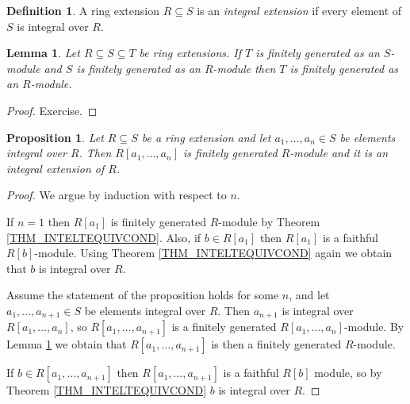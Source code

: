 \documentclass[12pt, letterpaper, oneside]{article}
\theoremstyle{plain}
\newtheorem{lemma}[theorem]{Lemma}
\newtheorem{proposition}[theorem]{Proposition}
\theoremstyle{definition}
\newtheorem{definition}[theorem]{Definition}
\newcommand{\vs}{\vskip 5mm}
\begin{document}
\vs\vs

\begin{definition}
A ring extension $R\subseteq S$ is an \emph{integral extension} if every element of $S$
is integral over $R$. 
\end{definition}

\vs\vs

\begin{lemma}
\label{LEMMA_COMPFINGENMOD}
Let $R\subseteq S \subseteq T$ be ring extensions. If $T$ is finitely generated as an
$S$-module and  $S$ is finitely generated as an $R$-module then $T$ is finitely generated as an 
$R$-module.
\end{lemma}

\vs

\begin{proof}
Exercise. 
\end{proof}

\vs\vs

\begin{proposition}
\label{PROP_INTELTSINTEXT}
Let $R\subseteq S$ be a  ring extension and let $a_{1}, \dots, a_{n}\in S $ be elements 
integral over $R$. Then $R[a_{1}, \dots, a_{n}]$ is finitely generated $R$-module and 
it  is an integral extension of $R$. 
\end{proposition}


\vs 


\begin{proof}
We argue by induction with respect to $n$. 

If $n=1$ then $R[a_{1}]$ is finitely generated $R$-module by 
Theorem  \ref{THM_INTELTEQUIVCOND}. Also, if $b\in R[a_{1}]$ then 
$R[a_{1}]$ is a faithful $R[b]$-module.  Using Theorem \ref{THM_INTELTEQUIVCOND}
again we obtain that $b$ is integral over $R$.   

Assume the statement of the proposition holds for some $n$, and let 
$a_{1}, \dots, a_{n+1}\in S$ be elements integral over $R$. Then $a_{n+1}$
is integral over $R[a_{1}, \dots, a_{n}]$, so $R[a_{1}, \dots, a_{n+1}]$ is a finitely 
generated $R[a_{1}, \dots, a_{n}]$-module. By  Lemma \ref{LEMMA_COMPFINGENMOD} 
we obtain that $R[a_{1}, \dots, a_{n+1}]$ is then a finitely generated $R$-module. 

If $b\in R[a_{1}, \dots, a_{n+1}]$ then $R[a_{1}, \dots, a_{n+1}]$ is a faithful $R[b]$ module, 
so by Theorem \ref{THM_INTELTEQUIVCOND} $b$ is integral over $R$. 
\end{proof}


\vs\vs
\end{document}

